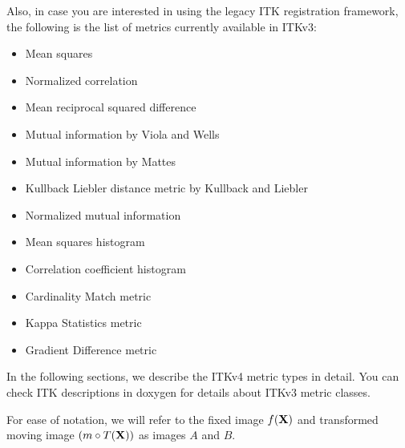 Also, in case you are interested in using the legacy ITK registration framework,
the following is the list of metrics currently available in ITKv3:
\begin{itemize}
\item Mean squares\\ 
\item Normalized correlation \\ 
\item Mean reciprocal squared difference \\ 
\item Mutual information by Viola and Wells \\ 
\item Mutual information by Mattes \\ 
\item Kullback Liebler distance metric by Kullback and Liebler \\ 
\item Normalized mutual information \\ 
\item Mean squares histogram \\ 
\item Correlation coefficient histogram \\ 
\item Cardinality Match metric \\ 
\item Kappa Statistics metric\\ 
\item Gradient Difference metric \\ 
\end{itemize}

In the following sections, we describe the ITKv4 metric types in detail.
You can check ITK descriptions in doxygen for details about ITKv3 metric classes.

For ease of notation, we will refer to the fixed image $f(\bf{X})$
and transformed moving image $(m \circ T(\bf{X}))$ as images $A$ and $B$.

